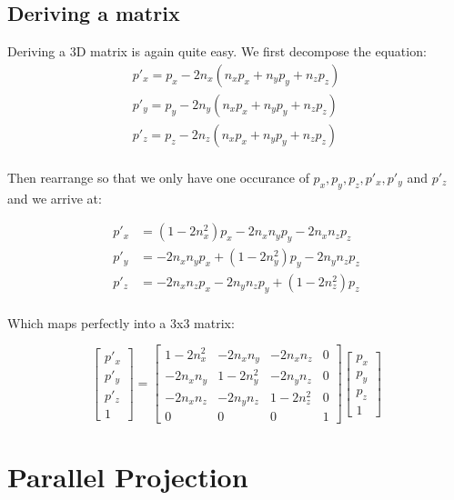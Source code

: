 \documentclass[]{report}   %
\begin{document}
\subsection{Deriving a matrix}
Deriving a 3D matrix is again quite easy. We first decompose the equation:
\begin{align*}
	p\prime_x = p_x - 2n_x(n_x p_x + n_y p_y + n_z p_z)		\\
	p\prime_y = p_y - 2n_y(n_x p_x + n_y p_y + n_z p_z)		\\
	p\prime_z = p_z - 2n_z(n_x p_x + n_y p_y + n_z p_z)		\\
\end{align*}

Then rearrange so that we only have one occurance of \(p_x, p_y, p_z, p\prime_x, p\prime_y\) and \(p\prime_z\)and we arrive at:

\begin{align*}
	p\prime_x &= (1 - 2n_x^2)p_x -2n_x n_y p_y -2n_x n_z p_z	\\
	p\prime_y &= -2n_x n_y p_x + (1 - 2n_y^2)p_y -2n_y n_z p_z	\\
	p\prime_z &= -2n_x n_z p_x -2n_y n_z p_y + (1 - 2n_z^2)p_z	\\
\end{align*}

Which maps perfectly into a 3x3 matrix:

\[
	\begin{bmatrix}
	p\prime_x \\
	p\prime_y \\
	p\prime_z \\
	1
	\end{bmatrix}
	=	
	\begin{bmatrix}
		1 - 2n_x^2	&	-2n_x n_y	&	-2n_x n_z	&	0 \\
		-2n_x n_y	&	1 - 2n_y^2	& 	-2n_y n_z	&	0 \\
		-2n_x n_z	&	-2n_y n_z	&	1 - 2n_z^2	&	0 \\
		0 			&		0 		& 		0 		&	1
	\end{bmatrix}
	\begin{bmatrix}
		p_x \\
		p_y \\
		p_z \\
		1
	\end{bmatrix}
\]


\section{Parallel Projection}
\end{document}
